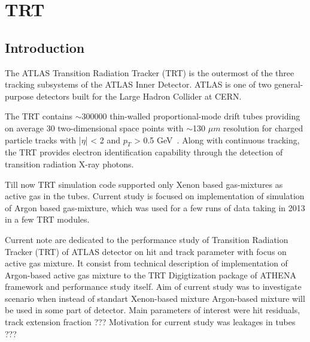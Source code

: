 \chapter{TRT}
\label{chap:TRT}

\section{Introduction}
\label{sec:TRT:introduction}




The ATLAS Transition Radiation Tracker (TRT) is the outermost of the three tracking subsystems of the ATLAS Inner Detector. 
ATLAS is one of two general-purpose detectors built for the Large Hadron Collider at CERN.

The TRT contains $\sim$300000 thin-walled proportional-mode drift tubes providing on average 30 two-dimensional 
space points with $\sim$130 $\mu m$ resolution for charged particle tracks with |$\eta$| < 2 and $p_T$ > 0.5 GeV~\cite{Abat:2008zza,Abat:2008zzb,Abat:2008zz}.
Along with continuous tracking, the TRT provides electron identification capability through the detection of transition radiation X-ray photons.

Till now TRT simulation code supported only Xenon based gas-mixtures as active gas in the tubes. 
Current study is focused on implementation of simulation of Argon based gas-mixture, 
which was used for a few runs of data taking in 2013 in a few TRT modules.


Current note are dedicated to the performance study of Transition Radiation Tracker (TRT) of ATLAS detector on hit and track parameter with focus on active gas mixture.
It consist from technical description of implementation of Argon-based active gas mixture to the TRT Digigtization package of ATHENA framework and performance study itself. 
Aim of current study was to investigate scenario when instead of standart Xenon-based mixture Argon-based mixture will be used in some part of detector. Main parameters of interest
were hit residuals, track extension fraction ???
Motivation for current study was leakages in tubes ???





